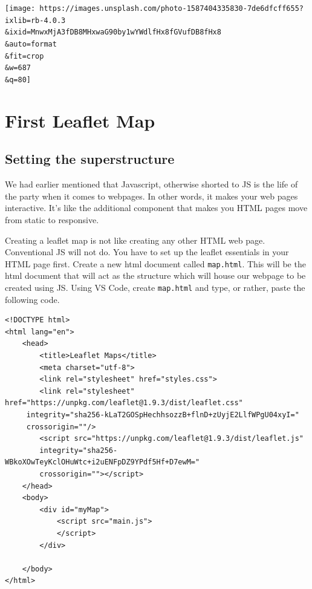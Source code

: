 \documentclass[
]{book}
\theoremstyle{definition}
\theoremstyle{definition}
\theoremstyle{definition}
\theoremstyle{definition}
\theoremstyle{remark}
\begin{document}
\texttt{[image: https://images.unsplash.com/photo-1587404335830-7de6dfcff655?ixlib=rb-4.0.3\\\&ixid=MnwxMjA3fDB8MHxwaG90by1wYWdlfHx8fGVufDB8fHx8\\\&auto=format\\\&fit=crop\\\&w=687\\\&q=80]}

\hypertarget{first-leaflet-map}{%
\chapter{First Leaflet Map}\label{first-leaflet-map}}

\hypertarget{setting-the-superstructure}{%
\section{Setting the superstructure}\label{setting-the-superstructure}}

We had earlier mentioned that Javascript, otherwise shorted to JS is the life of the party when it comes to webpages. In other words, it makes your web pages interactive. It's like the additional component that makes you HTML pages move from static to responsive.

Creating a leaflet map is not like creating any other HTML web page. Conventional JS will not do. You have to set up the leaflet essentials in your HTML page first. Create a new html document called \texttt{map.html}. This will be the html document that will act as the structure which will house our webpage to be created using JS. Using VS Code, create \texttt{map.html} and type, or rather, paste the following code.

\begin{verbatim}
<!DOCTYPE html>
<html lang="en">
    <head>
        <title>Leaflet Maps</title>
        <meta charset="utf-8">
        <link rel="stylesheet" href="styles.css">
        <link rel="stylesheet" href="https://unpkg.com/leaflet@1.9.3/dist/leaflet.css"
     integrity="sha256-kLaT2GOSpHechhsozzB+flnD+zUyjE2LlfWPgU04xyI="
     crossorigin=""/>
        <script src="https://unpkg.com/leaflet@1.9.3/dist/leaflet.js"
        integrity="sha256-WBkoXOwTeyKclOHuWtc+i2uENFpDZ9YPdf5Hf+D7ewM="
        crossorigin=""></script>
    </head>
    <body>
        <div id="myMap">
            <script src="main.js">
            </script> 
        </div>  
        
    </body>
</html>
\end{verbatim}
\end{document}
